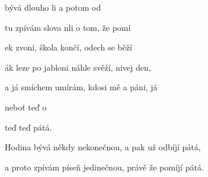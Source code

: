
\zs
{} bývá dlouho li a potom od 

 tu zpívám slova nli o tom, že pomí 
\ks

\zr
{}ek zvoní, škola končí, odech se běží

ák leze po jabloni  náhle svěží, nivej den,

a já smíchem umírám, kdosi mě  a páni, já 

neboť   teď o 

 teď    teď   pátá.
\kr

\zs
Hodina bývá někdy nekonečnou, a pak už odbíjí pátá,

a proto zpívám píseň jedinečnou, právě že pomíjí pátá.
\ks


\zr \kr

\kp






